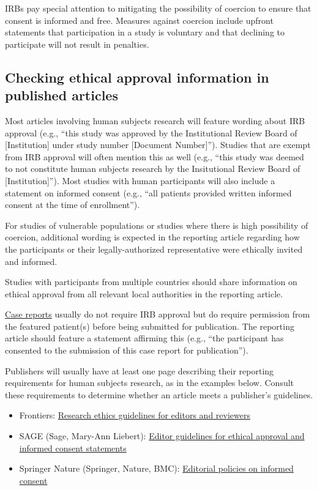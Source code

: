 \documentclass[letterpaper, 12pt]{article}
\begin{document}
IRBs pay special attention to mitigating the possibility of coercion to ensure that consent is informed and free. Measures against coercion include upfront statements that participation in a study is voluntary and that declining to participate will not result in penalties.

\subsection*{Checking ethical approval information in published articles}

Most articles involving human subjects research will feature wording about IRB approval (e.g., ``this study was approved by the Institutional Review Board of [Institution] under study number [Document Number]''). Studies that are exempt from IRB approval will often mention this as well (e.g., ``this study was deemed to not constitute human subjects research by the Insitutional Review Board of [Institution]''). Most studies with human participants will also include a statement on informed consent (e.g., ``all patients provided written informed consent at the time of enrollment''). 

For studies of vulnerable populations or studies where there is high possibility of coercion, additional wording is expected in the reporting article regarding how the participants or their legally-authorized representative were ethically invited and informed.

Studies with participants from multiple countries should share information on ethical approval from all relevant local authorities in the reporting article.

\href{https://en.wikipedia.org/wiki/Case_report}{Case reports} usually do not require IRB approval but do require permission from the featured patient(s) before being submitted for publication. The reporting article should feature a statement affirming this (e.g., ``the participant has consented to the submission of this case report for publication'').

Publishers will usually have at least one page describing their reporting requirements for human subjects research, as in the examples below. Consult these requirements to determine whether an article meets a publisher's guidelines.

\begin{itemize}
    \setlength\itemsep{-0.5em}
    \item Frontiers: \href{https://www.frontiersin.org/files/pdf/Research%20ethics_guidelines%20for%20editors%20and%20reviewers.pdf}{Research ethics guidelines for editors and reviewers}
    \item SAGE (Sage, Mary-Ann Liebert): \href{https://uk.sagepub.com/sites/default/files/editor_guidelines.pdf}{Editor guidelines for ethical approval and informed consent statements}
    \item Springer Nature (Springer, Nature, BMC): \href{https://www.springer.com/gp/editorial-policies/informed-consent?srsltid=AfmBOoryhgl-fRz6G7UtywN7SY2D62DcbOkNGsW8LHI4PtwA75TfNNFD}{Editorial policies on informed consent}
\end{itemize}
\end{document}
